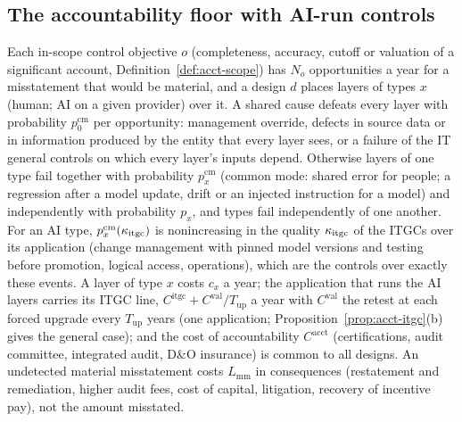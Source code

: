 \subsection{The accountability floor with AI-run controls}\label{sec:acct-amin}

\begin{assumption}\label{ass:acct-layers}
Each in-scope control objective $o$ (completeness, accuracy, cutoff or valuation of a significant account, Definition~\ref{def:acct-scope}) has $N_o$ opportunities a year for a misstatement that would be material, and a design $d$ places layers of types $x$ (human; AI on a given provider) over it. A shared cause defeats every layer with probability $p^{\mathrm{cm}}_0$ per opportunity: management override, defects in source data or in information produced by the entity that every layer sees, or a failure of the IT general controls on which every layer's inputs depend. Otherwise layers of one type fail together with probability $p^{\mathrm{cm}}_x$ (common mode: shared error for people; a regression after a model update, drift or an injected instruction for a model) and independently with probability $p_x$, and types fail independently of one another. For an AI type, $p^{\mathrm{cm}}_x(\kappa_{\rm itgc})$ is nonincreasing in the quality $\kappa_{\rm itgc}$ of the ITGCs over its application (change management with pinned model versions and testing before promotion, logical access, operations), which are the controls over exactly these events. A layer of type $x$ costs $c_x$ a year; the application that runs the AI layers carries its ITGC line, $C^{\mathrm{itgc}}+C^{\mathrm{val}}/T_{\mathrm{up}}$ a year with $C^{\mathrm{val}}$ the retest at each forced upgrade every $T_{\mathrm{up}}$ years (one application; Proposition~\ref{prop:acct-itgc}(b) gives the general case); and the cost of accountability $C^{\mathrm{acct}}$ (certifications, audit committee, integrated audit, D\&O insurance) is common to all designs. An undetected material misstatement costs $L_{\mathrm{mm}}$ in consequences (restatement and remediation, higher audit fees, cost of capital, litigation, recovery of incentive pay), not the amount misstated.
\end{assumption}

